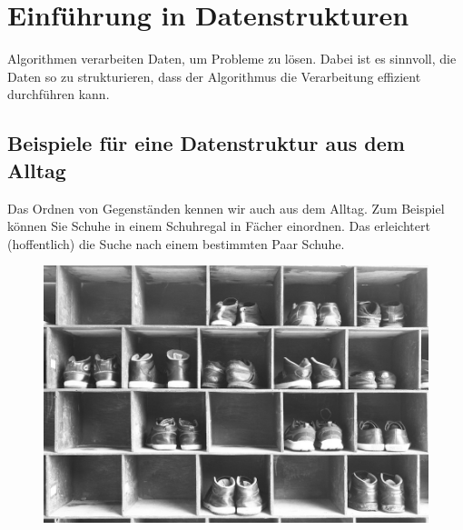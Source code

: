 


\toggletrue{image}
\toggletrue{imagehover}

\chapter{Einführung in Datenstrukturen}
\label{chapter-einfuehrung-datenstrukturen}

Algorithmen verarbeiten Daten, um Probleme zu lösen. Dabei ist es sinnvoll, die Daten so zu strukturieren, dass der Algorithmus die Verarbeitung effizient durchführen kann.

\section{Beispiele für eine Datenstruktur aus dem Alltag}

\begin{example}
Das Ordnen von Gegenständen kennen wir auch aus dem Alltag. Zum Beispiel können Sie Schuhe in einem Schuhregal in Fächer einordnen. Das erleichtert (hoffentlich) die Suche nach einem bestimmten Paar Schuhe.
\end{example}

\begin{figure}[htb]
	\centering
	\includegraphics[scale=0.2]{schuhregal}
\end{figure}

